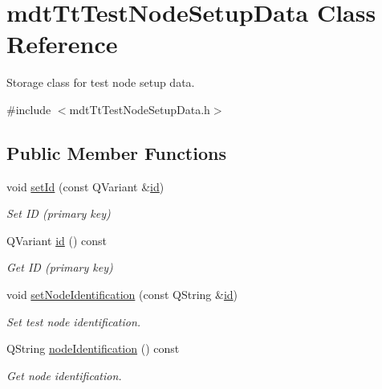 \hypertarget{classmdt_tt_test_node_setup_data}{\section{mdt\-Tt\-Test\-Node\-Setup\-Data Class Reference}
\label{classmdt_tt_test_node_setup_data}
}


Storage class for test node setup data.  




{\ttfamily \#include $<$mdt\-Tt\-Test\-Node\-Setup\-Data.\-h$>$}

\subsection*{Public Member Functions}
\begin{DoxyCompactItemize}
\item 
void \hyperlink{classmdt_tt_test_node_setup_data_a0ae8a7d03374e4262eee104caa3c1d45}{set\-Id} (const Q\-Variant \&\hyperlink{classmdt_tt_test_node_setup_data_a1e11fe63db0681a9e425da40bf9ec4b9}{id})
\begin{DoxyCompactList}\small\item\em Set I\-D (primary key) \end{DoxyCompactList}\item 
Q\-Variant \hyperlink{classmdt_tt_test_node_setup_data_a1e11fe63db0681a9e425da40bf9ec4b9}{id} () const 
\begin{DoxyCompactList}\small\item\em Get I\-D (primary key) \end{DoxyCompactList}\item 
void \hyperlink{classmdt_tt_test_node_setup_data_a2faae3ec127611d7ccfd9f4b09d3f235}{set\-Node\-Identification} (const Q\-String \&\hyperlink{classmdt_tt_test_node_setup_data_a1e11fe63db0681a9e425da40bf9ec4b9}{id})
\begin{DoxyCompactList}\small\item\em Set test node identification. \end{DoxyCompactList}\item 
Q\-String \hyperlink{classmdt_tt_test_node_setup_data_ae67aa6db6cc82bbba059942b3b7bba3b}{node\-Identification} () const 
\begin{DoxyCompactList}\small\item\em Get node identification. \end{DoxyCompactList}\item 

\end{DoxyCompactItemize}
